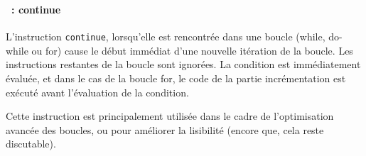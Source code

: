 \begin{frame}[containsverbatim]
  \frametitle{\secname}
  \framesubtitle{\subsecname~: continue}

  L'instruction \verb|continue|, lorsqu'elle est rencontrée dans une boucle (while, do-while ou for) cause le début immédiat d'une nouvelle itération de la boucle. Les 
  instructions restantes de la boucle sont ignorées. La condition est immédiatement évaluée, et dans le cas de la boucle for, le code de la partie incrémentation est
  exécuté avant l'évaluation de la condition.
  \vspace{0.5cm}
  \par
  Cette instruction est principalement utilisée dans le cadre de l'optimisation avancée des boucles, ou pour améliorer la lisibilité (encore que, cela reste discutable).
\end{frame}

